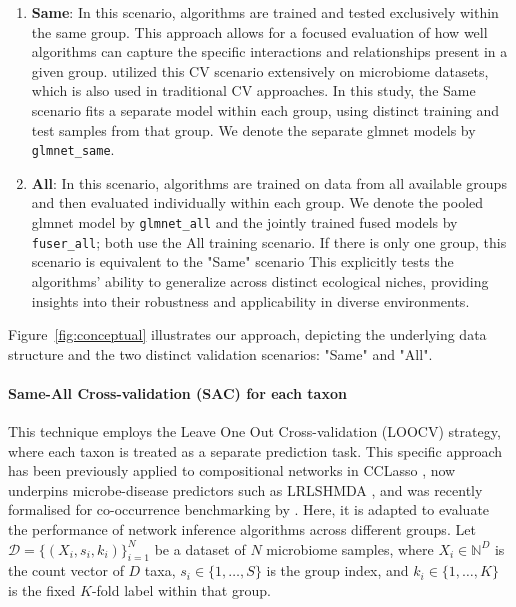 \documentclass[]{Liebert_Author_revised}
\providecommand{\DIFadd}[1]{{\ifmmode\else\leavevmode\fi\color{blue}#1}} %
\providecommand{\DIFaddbegin}{} %
\providecommand{\DIFaddend}{} %
\begin{document}
\begin{enumerate}
    \item \textbf{Same}: In this scenario, algorithms are trained and tested exclusively within the same  \DIFaddbegin \DIFadd{group}\DIFaddend .
    This approach allows for a focused evaluation of how well algorithms can capture the specific interactions and relationships present in a given  \DIFaddbegin \DIFadd{group}\DIFaddend .
    \citet{agyapong2025cross} utilized this CV scenario extensively on microbiome datasets, which is also used in traditional CV approaches.
     \DIFaddbegin \DIFadd{In this study, the Same scenario fits a separate model within each group, using distinct }\DIFaddend training and test  \DIFaddbegin \DIFadd{samples from that group. We denote the separate glmnet models by \texttt{glmnet\_same}.
}\DIFaddend 

    \item \textbf{All}: In this scenario, algorithms are trained on data from all available  \DIFaddbegin \DIFadd{groups }\DIFaddend and then evaluated individually within each  \DIFaddbegin \DIFadd{group.
    We denote the pooled glmnet model by \texttt{glmnet\_all} and the jointly trained fused models by \texttt{fuser\_all}; both use the All training scenario.
    }\DIFaddend If there is only one  \DIFaddbegin \DIFadd{group}\DIFaddend , this scenario is equivalent to the "Same" scenario \citep{hocking2024soaksameotherallkfoldcrossvalidation}
    This explicitly tests the algorithms' ability to generalize across distinct ecological niches, providing insights into their robustness and applicability in diverse  \DIFaddbegin \DIFadd{environments}\DIFaddend .
\end{enumerate}

Figure~\ref{fig:conceptual} illustrates our approach, depicting the underlying data structure and the two distinct validation scenarios: "Same" and "All".
 \DIFaddbegin \paragraph{\DIFadd{Same-All Cross-validation (SAC) for each taxon}}
\DIFadd{This }\DIFaddend technique employs the Leave One Out Cross-validation (LOOCV) strategy, where each taxon is treated as a separate prediction task.
This specific approach has been previously applied to compositional networks in CCLasso \citep{fang2015cclasso}, now underpins microbe-disease predictors such as LRLSHMDA \citep{wang2017lrlshmda}, and was recently formalised for co-occurrence benchmarking by \citet{agyapong2025cross}.
Here, it is adapted to evaluate the performance of network inference algorithms across different  \DIFaddbegin \DIFadd{groups}\DIFaddend .
Let \(\mathcal{D}=\{(X_i,s_i,k_i)\}_{i=1}^{N}\) be a dataset of \(N\) microbiome samples,
where \(X_i\in\mathbb{N}^{D}\) is the count vector of \(D\) taxa,
\(s_i\in\{1,\dots,S\}\) is the  \DIFaddbegin \DIFadd{group }\DIFaddend index,
and \(k_i\in\{1,\dots,K\}\) is the fixed \(K\)-fold label within that  \DIFaddbegin \DIFadd{group}\DIFaddend .
\end{document}
